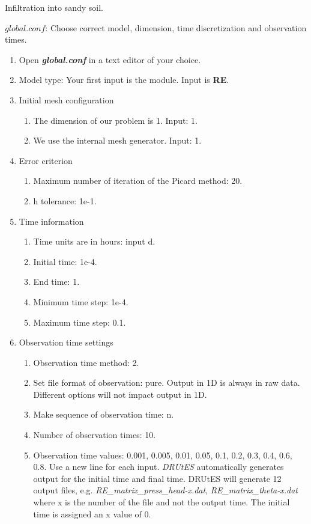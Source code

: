 Infiltration into sandy soil. 

$global.conf$: Choose correct model, dimension, time discretization and observation times.
\begin{enumerate}
\item Open \textbf{\emph{global.conf}} in a text editor of your choice. 
\item Model type: Your first input is the module. Input is \textbf{RE}.
\item Initial mesh configuration \begin{enumerate}
\item The dimension of our problem is 1. Input: 1.
\item We use the internal mesh generator. Input: 1.
\end{enumerate}
\item Error criterion \begin{enumerate} 
\item Maximum number of iteration of the Picard method: 20.
\item h tolerance: 1e-1.
\end{enumerate}
\item Time information 
\begin{enumerate} 
\item Time units are in hours: input d.
\item Initial time: 1e-4.
\item End time: 1.
\item Minimum time step: 1e-4.
\item Maximum time step: 0.1.
\end{enumerate}
\item Observation time settings \begin{enumerate}
\item Observation time method: 2.
\item Set file format of observation: pure. Output in 1D is always in raw data. Different options will not impact output in 1D.
\item Make sequence of observation time: n.
\item Number of observation times: 10.
\item Observation time values: 0.001,
0.005,
0.01,
0.05,
0.1,
0.2,
0.3,
0.4,
0.6,
0.8. Use a new line for each input. \textit{DRUtES} automatically generates output for the initial time and final time. DRUtES will generate 12 output files, e.g. \textit{RE\_matrix\_press\_head-x.dat}, \textit{RE\_matrix\_theta-x.dat} where x is the number of the file and not the output time. The initial time is assigned an x value of 0. 

\end{enumerate}
\end{enumerate}
